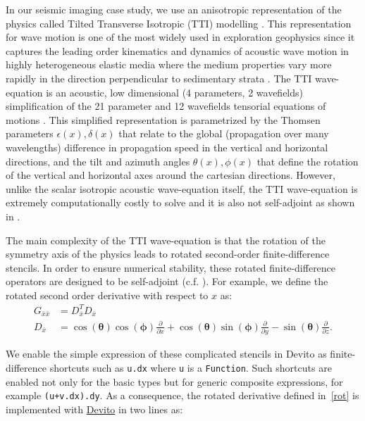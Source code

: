 \documentclass[10pt, conference]{IEEEtran}
\newcommand{\devito}{\href{https://github.com/devitocodes/devito}{Devito} }
\begin{document}
In our seismic imaging case study, we use an anisotropic representation of the
physics called Tilted Transverse Isotropic (TTI) modelling \cite{thomsen1986}. This
representation for wave motion is one of the most widely used in exploration
geophysics since it captures the leading order kinematics and dynamics of
acoustic wave motion in highly heterogeneous elastic media where the medium
properties vary more rapidly in the direction perpendicular to sedimentary
strata \cite{alkhalifah2000, baysal1983, bubetti2012, bubetti2014,
bubesatti2016, chu2011, duveneck, fletcher, fowlertti2010,
louboutin2018segeow, whitmore1983, witte2016segpve, xu2014, zhang2005,
zhang2011, zhan2013}. The TTI wave-equation is an acoustic, low dimensional (4
parameters, 2 wavefields) simplification of the 21 parameter and 12 wavefields
tensorial equations of motions \cite{hooke}. This simplified representation is
parametrized by the Thomsen parameters $\epsilon(x), \delta(x)$ that relate to
the global (propagation over many wavelengths) difference in propagation speed
in the vertical and horizontal directions, and the tilt and azimuth angles
$\theta(x), \phi(x)$ that define the rotation of the vertical and horizontal
axes around the cartesian directions. However, unlike the scalar isotropic
acoustic wave-equation itself, the TTI wave-equation is extremely
computationally costly to solve and it is also not self-adjoint as shown in
\cite{louboutin2018segeow}.

The main complexity of the TTI wave-equation is that the rotation of the
symmetry axis of the physics leads to rotated second-order finite-difference
stencils. In order to ensure numerical stability, these rotated
finite-difference operators are designed to be self-adjoint (c.f.
\cite{zhang2011, duveneck}). For example, we define the rotated second order
derivative with respect to $x$ as:
%
\begin{equation}
\begin{aligned}
  G_{\bar{x}\bar{x}} &= D_{\bar{x}}^T D_{\bar{x}} \\
  D_{\bar{x}} &= \cos(\mathbf{\theta})\cos(\mathbf{\phi})\frac{\partial}{\partial x} + \cos(\mathbf{\theta})\sin(\mathbf{\phi})\frac{\partial}{\partial y} - \sin(\mathbf{\theta})\frac{\partial}{\partial z}.
\end{aligned}
\label{rot}
\end{equation}
%

We enable the simple expression of these complicated stencils in Devito
as finite-difference shortcuts such as \texttt{u.dx} where \texttt{u} is
a \texttt{Function}. Such shortcuts are enabled not only for the basic
types but for generic composite expressions, for example
\texttt{(u\phantom{\ }+\phantom{\ }v.dx).dy}. As a consequence, the
rotated derivative defined in~\ref{rot} is implemented with \devito in two
lines as:
\end{document}
